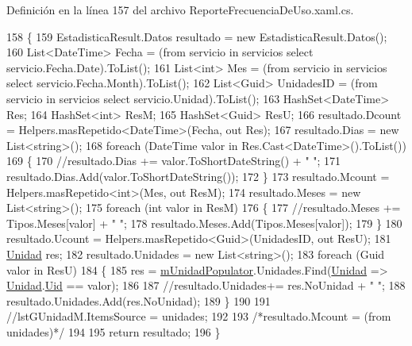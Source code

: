 Definición en la línea 157 del archivo Reporte\-Frecuencia\-De\-Uso.\-xaml.\-cs.


\begin{DoxyCode}
158         \{
159             EstadisticaResult.Datos resultado = \textcolor{keyword}{new} EstadisticaResult.Datos();
160             List<DateTime> Fecha = (from servicio in servicios select servicio.Fecha.Date).ToList();
161             List<int> Mes = (from servicio in servicios select servicio.Fecha.Month).ToList();
162             List<Guid> UnidadesID = (from servicio in servicios select servicio.Unidad).ToList();
163             HashSet<DateTime> Res;
164             HashSet<int> ResM;
165             HashSet<Guid> ResU;
166             resultado.Dcount = Helpers.masRepetido<DateTime>(Fecha, out Res);
167             resultado.Dias = \textcolor{keyword}{new} List<string>();
168             \textcolor{keywordflow}{foreach} (DateTime valor \textcolor{keywordflow}{in} Res.Cast<DateTime>().ToList())
169             \{
170                 \textcolor{comment}{//resultado.Dias += valor.ToShortDateString() + " ";}
171                 resultado.Dias.Add(valor.ToShortDateString());
172             \}
173             resultado.Mcount = Helpers.masRepetido<\textcolor{keywordtype}{int}>(Mes, out ResM);
174             resultado.Meses = \textcolor{keyword}{new} List<string>();
175             \textcolor{keywordflow}{foreach} (\textcolor{keywordtype}{int} valor \textcolor{keywordflow}{in} ResM)
176             \{
177                 \textcolor{comment}{//resultado.Meses += Tipos.Meses[valor] + " ";}
178                 resultado.Meses.Add(Tipos.Meses[valor]);
179             \}
180             resultado.Ucount = Helpers.masRepetido<Guid>(UnidadesID, out ResU);
181             \hyperlink{class_proyecto___integrador__3_1_1_tipos_dato_1_1_unidad}{Unidad} res;
182             resultado.Unidades = \textcolor{keyword}{new} List<string>();
183             \textcolor{keywordflow}{foreach} (Guid valor \textcolor{keywordflow}{in} ResU)
184             \{
185                 res = \hyperlink{class_proyecto___integrador__3_1_1_reportes_1_1_reporte_frecuencia_de_uso_a91106ba7bf23e61d729bc0399ef5fa98}{mUnidadPopulator}.Unidades.Find(\hyperlink{class_proyecto___integrador__3_1_1_tipos_dato_1_1_unidad}{Unidad} => 
      \hyperlink{class_proyecto___integrador__3_1_1_tipos_dato_1_1_unidad}{Unidad}.\hyperlink{class_proyecto___integrador__3_1_1_tipos_dato_1_1_unidad_aa2e602251694986f3d519ee3db5ffa38}{Uid} == valor);
186 
187                 \textcolor{comment}{//resultado.Unidades+= res.NoUnidad + " ";}
188                 resultado.Unidades.Add(res.NoUnidad);
189             \}
190 
191             \textcolor{comment}{//lstGUnidadM.ItemsSource = unidades;}
192 
193             \textcolor{comment}{/*resultado.Mcount = (from unidades)*/}
194 
195             \textcolor{keywordflow}{return} resultado;
196         \}
\end{DoxyCode}
